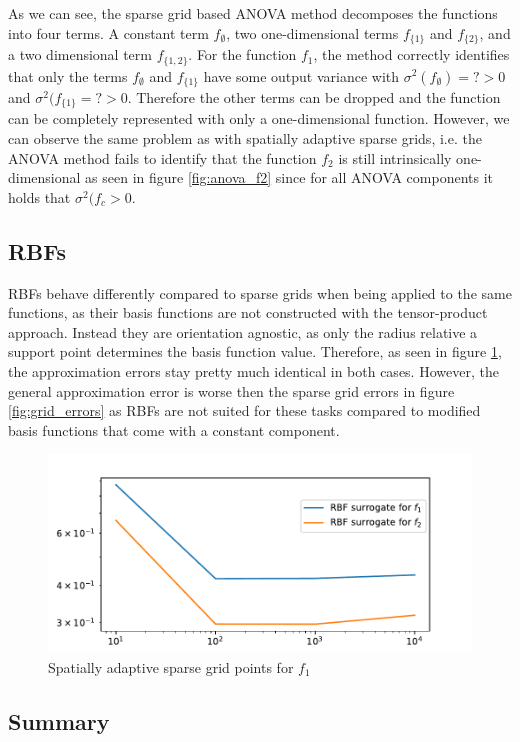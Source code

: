 \documentclass[
  a4paper,  %
  twoside,  %
  bibliography=totoc,
  headsepline,
  cleardoublepage=empty,
  parskip=half,
  draft=false
]{scrbook}
\begin{document}
As we can see, the sparse grid based ANOVA method decomposes the functions into four terms.
A constant term $f_\emptyset$, two one-dimensional terms $f_{\{1\}}$ and $f_{\{2\}}$, and a two dimensional term $f_{\{1,2\}}$.
For the function $f_1$, the method correctly identifies that only the terms $f_\emptyset$ and $f_{\{1\}}$ have some output variance with $\sigma^2(f_\emptyset)=? > 0$ and $\sigma^2(f_{\{1\}}=? > 0$.
Therefore the other terms can be dropped and the function can be completely represented with only a one-dimensional function.
However, we can observe the same problem as with spatially adaptive sparse grids, i.e. the ANOVA method fails to identify that the function $f_2$ is still intrinsically one-dimensional as seen in figure \ref{fig:anova_f2} since for all ANOVA components it holds that $\sigma^2(f_{c}> 0$.


\subsection{RBFs}
RBFs behave differently compared to sparse grids when being applied to the same functions, as their basis functions are not constructed with the tensor-product approach.
Instead they are orientation agnostic, as only the radius relative a support point determines the basis function value.
Therefore, as seen in figure \ref{fig:rbf_errors}, the approximation errors stay pretty much identical in both cases.
However, the general approximation error is worse then the sparse grid errors in figure \ref{fig:grid_errors} as RBFs are not suited for these tasks compared to modified basis functions that come with a constant component.


\begin{figure}[H]
  \centering
  \includegraphics[width=.8\linewidth]{graphics/rbf_errors}
  \caption{Spatially adaptive sparse grid points for $f_1$}
  \label{fig:rbf_errors}
\end{figure}

\subsection{Summary}
\end{document}
